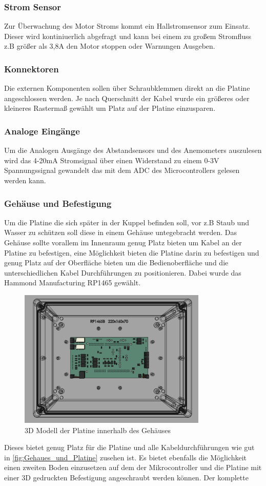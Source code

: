 \subsubsection{Strom Sensor}
Zur Überwachung des Motor Stroms kommt ein Hallstromsensor zum Einsatz. Dieser wird kontiniuerlich abgefragt und kann bei einem zu großem Stromfluss z.B größer als 3,8A den Motor stoppen oder Warnungen Ausgeben.
\subsubsection{Konnektoren}
Die externen Komponenten sollen über Schraubklemmen direkt an die Platine angeschlossen werden. Je nach Querschnitt der Kabel wurde ein größeres oder kleineres Rastermaß gewählt um Platz auf der Platine einzusparen.
\subsubsection{Analoge Eingänge}
Um die Analogen Ausgänge des Abstandsensors und des Anemometers auszulesen wird das 4-20mA Stromsignal über einen Widerstand zu einem 0-3V Spannungssignal gewandelt das mit dem \ac{ADC} des Microcontrollers gelesen werden kann.
\subsubsection{Gehäuse und Befestigung}
Um die Platine die sich später in der Kuppel befinden soll, vor z.B Staub und Wasser zu schützen soll diese in einem Gehäuse untegebracht werden. Das Gehäuse sollte vorallem im Innenraum genug Platz bieten um Kabel an der Platine zu befestigen, eine Möglichkeit bieten die Platine darin zu befestigen und genug Platz auf der Oberfläche bieten um die Bedienoberfläche und die unterschiedlichen Kabel Durchführungen zu positionieren. Dabei wurde das Hammond Manufacturing RP1465 gewählt. 
\begin{figure}[H]
	\centering
	\includegraphics[width=0.8\textwidth]{images/Hardware/Platine_in_gehause.PNG}
	\caption{3D Modell der Platine innerhalb des Gehäuses}
	\label{fig:Gehaues_und_Platine}
\end{figure}
\noindent Dieses bietet genug Platz für die Platine und alle Kabeldurchführungen wie gut in \autoref{fig:Gehaues_und_Platine} zusehen ist. Es bietet ebenfalls die Möglichkeit einen zweiten Boden einzusetzen auf dem der Mikrocontroller und die Platine mit einer 3D gedruckten Befestigung angeschraubt werden können.
Der komplette 
